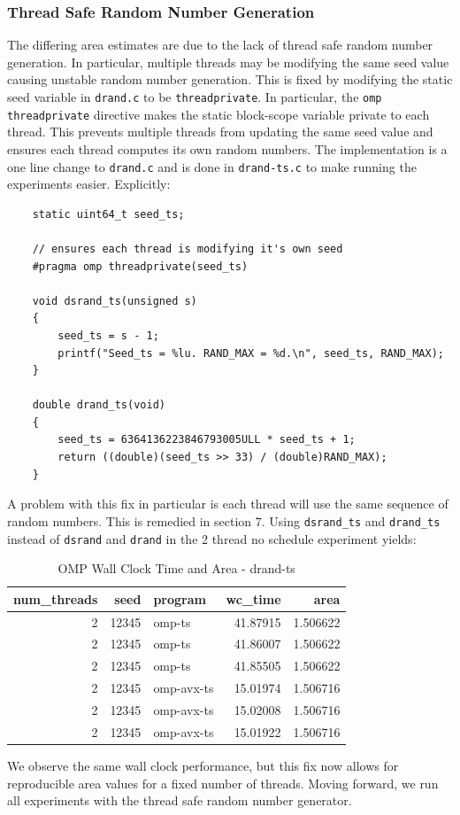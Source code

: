\documentclass{article}
\begin{document}
\subsubsection{Thread Safe Random Number Generation}
The differing area estimates are due to the lack of thread safe random number generation. In particular, 
multiple threads may be modifying the same seed value causing unstable random number 
generation. This is fixed by modifying the static seed variable in \texttt{drand.c} to be \texttt{threadprivate}. 
In particular, the \texttt{omp threadprivate} directive makes the static block-scope variable private to each 
thread. This prevents multiple threads from updating the same seed value and ensures each thread 
computes its own random numbers. The implementation is a one line change to \texttt{drand.c} and is done in \texttt{drand-ts.c} 
to make running the experiments easier. Explicitly:
\begin{lstlisting}
    static uint64_t seed_ts;
    
    // ensures each thread is modifying it's own seed
    #pragma omp threadprivate(seed_ts)
    
    void dsrand_ts(unsigned s)
    {
        seed_ts = s - 1;
        printf("Seed_ts = %lu. RAND_MAX = %d.\n", seed_ts, RAND_MAX);
    }
    
    double drand_ts(void)
    {
        seed_ts = 6364136223846793005ULL * seed_ts + 1;
        return ((double)(seed_ts >> 33) / (double)RAND_MAX);
    } 
\end{lstlisting}
A problem with this fix in particular is each thread will use the same sequence of random numbers. 
This is remedied in section 7. Using \texttt{dsrand\_ts} and \texttt{drand\_ts} instead of \texttt{dsrand} and \texttt{drand} in the 
2 thread no schedule experiment yields:
\begin{table}[H]
    \centering
    \caption{OMP Wall Clock Time and Area - drand-ts}
    \centering
    \fontsize{12}{14}\selectfont
    \begin{tabular}[t]{r|r|l|r|r}
    \hline
    num\_threads & seed & program & wc\_time & area\\
    \hline
    2 & 12345 & omp-ts & 41.87915 & 1.506622\\
    \hline
    2 & 12345 & omp-ts & 41.86007 & 1.506622\\
    \hline
    2 & 12345 & omp-ts & 41.85505 & 1.506622\\
    \hline
    2 & 12345 & omp-avx-ts & 15.01974 & 1.506716\\
    \hline
    2 & 12345 & omp-avx-ts & 15.02008 & 1.506716\\
    \hline
    2 & 12345 & omp-avx-ts & 15.01922 & 1.506716\\
    \hline
    \end{tabular}
\end{table}
\noindent We observe the same wall clock performance, but this fix now allows for reproducible area values for a fixed number of threads. 
Moving forward, we run all experiments with the thread safe random number generator.
\end{document}
